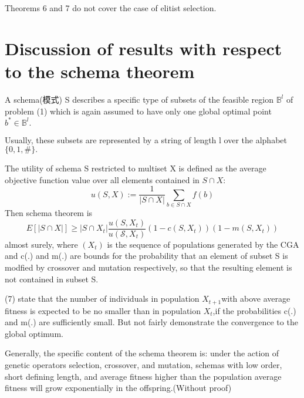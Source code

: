 \documentclass{article}
\newcommand{\assign}{:=}
\begin{document}
\begin{note}
  Theorems 6 and 7 do not cover the case of elitist selection.\\
  
\end{note}

\section{Discussion of results with respect to the schema theorem}

A schema(模式) S describes a specific type of subsets of the feasible region
$\mathbb{B}^l$ of problem (1) which is again assumed to have only one global
optimal point $b^{\ast} \in \mathbb{B}^l .$

Usually, these subsets are represented by a string of length l over the
alphabet $\{ 0, 1, \# \} .$

The utility of schema S restricted to multiset X is defined as the average
objective function value over all elements contained in $S \cap X$:
\begin{equation}
  u (S, X) \assign \frac{1}{| S \cap X |} \underset{b \in S \cap X}{\sum} f
  (b)
\end{equation}
Then schema theorem is
\begin{equation}
  E [| S \cap X |] \geqslant | S \cap X_t | \frac{u (S, X_t)}{u (\mathcal{S},
  X_t)} (1 - c (S, X_t)) (1 - m (S, X_t))
\end{equation}
almost surely, where $(X_t)$ is the sequence of populations generated by the
CGA and c(.) and m(.) are bounds for the probability that an element of subset
S is modfied by crossover and mutation respectively, so that the resulting
element is not contained in subset S.

\begin{remark}
  (7) state that the number of individuals in population $X_{t + 1} $with
  above average fitness is expected to be no smaller than in population $X_t
  $,if the probabilities c(.) and m(.) are sufficiently small. But not fairly
  demonstrate the convergence to the global optimum.
  
  Generally, the specific content of the schema theorem is: under the action
  of genetic operators selection, crossover, and mutation, schemas with low
  order, short defining length, and average fitness higher than the population
  average fitness will grow exponentially in the offspring.(Without proof)
\end{remark}
\end{document}
